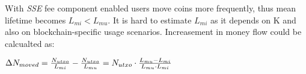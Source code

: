 \documentclass[]{article}   %
\newcommand{\esse}{\textit{SSE}}
\newcommand{\ignore}[1]{} %
\begin{document}
With \esse{} fee component enabled users move coins more frequently, thus mean lifetime becomes $L_{mi} < L_{mu}$. It is hard to estimate $L_{mi}$ as it depends on K and also on blockchain-specific usage scenarios. Increasement in money flow could be calcualted as:

$\Delta N_{moved} = {N_{utxo} \over L_{mi}} - {N_{utxo} \over L_{mu}} = N_{utxo} \cdot {{L_{mu}-L_{mi}} \over {L_{mu} \cdot L_{mi}}}$


\ignore{
  In the \textit{Scheduled payments} mode there is an additional component in the flow which is miners moving an output every $D_s$ blocks:

  \begin{equation}
    N_{scheduled} \approx {N_{utxo} \over D_s}
  \end{equation}



  We can find a ratio between $N_{incentivized}$ and ${moved}$:

  \begin{equation}
    r_{flow} = {N_{incentivized} \over N_{moved}}  \approx {8180 \over L_{max-mean}} %
  \end{equation}

  For example, if a user pays for $8180$ blocks~(about 57 days) on average in the \textit{Prepaid} model, money flow doubles in comparison with a system without \esse{} component.  


  For \textit{Scheduled payments}:

  \begin{equation}
    r_{flow} = {{N_{incentivized} + N_{scheduled}} \over N_{moved}} %
  \end{equation}
}
\end{document}
